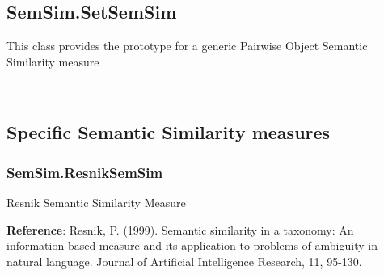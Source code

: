 \documentclass[letterpaper,10pt,english]{sphinxmanual}
\begin{document}
\subsection{SemSim.SetSemSim}
\label{fastsemsim.SemSim:module-fastsemsim.SemSim.SetSemSim}\label{fastsemsim.SemSim:semsim-setsemsim}
This class provides the prototype for a generic Pairwise Object Semantic Similarity measure

\begin{fulllineitems}
\label{fastsemsim.SemSim:fastsemsim.SemSim.SetSemSim.SetSemSim}~

\begin{fulllineitems}
\label{fastsemsim.SemSim:fastsemsim.SemSim.SetSemSim.SetSemSim.SemSim}
\end{fulllineitems}


\end{fulllineitems}



\subsection{Specific Semantic Similarity measures}
\label{fastsemsim.SemSim:specific-semantic-similarity-measures}

\subsubsection{SemSim.ResnikSemSim}
\label{fastsemsim.SemSim:module-fastsemsim.SemSim.ResnikSemSim}\label{fastsemsim.SemSim:semsim-resniksemsim}
Resnik Semantic Similarity Measure

\textbf{Reference}: Resnik, P. (1999). Semantic similarity in a taxonomy: An information-based measure and its application to problems of ambiguity in natural language. Journal of Artificial Intelligence Research, 11, 95-130.
\end{document}
